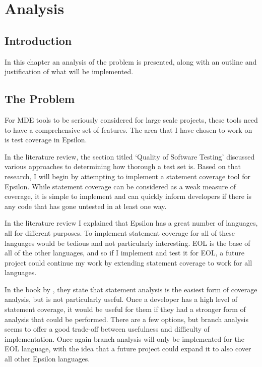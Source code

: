 \chapter{Analysis}
\label{chap:Analysis}

\section{Introduction}
In this chapter an analysis of the problem is presented, along with an outline and justification of what will be implemented.

\section{The Problem}

For MDE tools to be seriously considered for large scale projects, these tools need to have a comprehensive set of features. The area that I have chosen to work on is test coverage in Epsilon.

In the literature review, the section titled `Quality of Software Testing' discussed various approaches to determining how thorough a test set is. Based on that research, I will begin by attempting to implement a statement coverage tool for Epsilon. While statement coverage can be considered as a weak measure of coverage, it is simple to implement and can quickly inform developers if there is any code that has gone untested in at least one way.


In the literature review I explained that Epsilon has a great number of languages, all for different purposes. To implement statement coverage for all of these languages would be tedious and not particularly interesting. EOL is the base of all of the other languages, and so if I implement and test it for EOL, a future project could continue my work by extending statement coverage to work for all languages.

In the book by \citet{Myers:2004:AST:983238}, they state that statement analysis is the easiest form of coverage analysis, but is not particularly useful. Once a developer has a high level of statement coverage, it would be useful for them if they had a stronger form of analysis that could be performed. There are a few options, but branch analysis seems to offer a good trade-off between usefulness and difficulty of implementation. Once again branch analysis will only be implemented for the EOL language, with the idea that a future project could expand it to also cover all other Epsilon languages.

